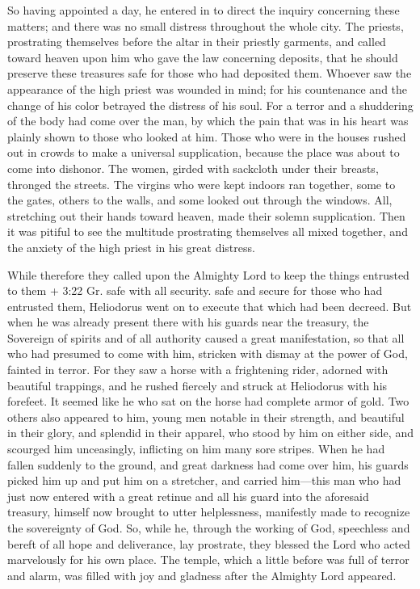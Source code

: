  So having appointed a day, he entered in to direct the
inquiry concerning these matters; and there was no small distress
throughout the whole city.  The priests, prostrating
themselves before the altar in their priestly garments, and called
toward heaven upon him who gave the law concerning deposits, that he
should preserve these treasures safe for those who had deposited them.
 Whoever saw the appearance of the high priest was wounded
in mind; for his countenance and the change of his color betrayed the
distress of his soul.  For a terror and a shuddering of the
body had come over the man, by which the pain that was in his heart was
plainly shown to those who looked at him.  Those who were
in the houses rushed out in crowds to make a universal supplication,
because the place was about to come into dishonor.  The
women, girded with sackcloth under their breasts, thronged the streets.
The virgins who were kept indoors ran together, some to the gates,
others to the walls, and some looked out through the windows.
 All, stretching out their hands toward heaven, made their
solemn supplication.  Then it was pitiful to see the
multitude prostrating themselves all mixed together, and the anxiety of
the high priest in his great distress.

 While therefore they called upon the Almighty Lord to keep
the things entrusted to them + 3:22 Gr. safe with all security. safe and
secure for those who had entrusted them,  Heliodorus went
on to execute that which had been decreed.  But when he was
already present there with his guards near the treasury, the Sovereign
of spirits and of all authority caused a great manifestation, so that
all who had presumed to come with him, stricken with dismay at the power
of God, fainted in terror.  For they saw a horse with a
frightening rider, adorned with beautiful trappings, and he rushed
fiercely and struck at Heliodorus with his forefeet. It seemed like he
who sat on the horse had complete armor of gold.  Two
others also appeared to him, young men notable in their strength, and
beautiful in their glory, and splendid in their apparel, who stood by
him on either side, and scourged him unceasingly, inflicting on him many
sore stripes.  When he had fallen suddenly to the ground,
and great darkness had come over him, his guards picked him up and put
him on a stretcher,  and carried him---this man who had
just now entered with a great retinue and all his guard into the
aforesaid treasury, himself now brought to utter helplessness,
manifestly made to recognize the sovereignty of God.  So,
while he, through the working of God, speechless and bereft of all hope
and deliverance, lay prostrate,  they blessed the Lord who
acted marvelously for his own place. The temple, which a little before
was full of terror and alarm, was filled with joy and gladness after the
Almighty Lord appeared.

